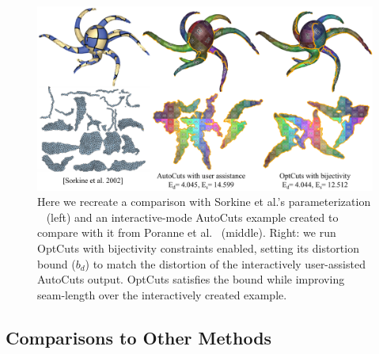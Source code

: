 \begin{figure}[t]
\centering
\includegraphics[width=\linewidth]{fig/comp_AutoCuts_Olga.png}
\caption{Here we recreate a comparison with Sorkine et al.'s parameterization \  (left) and an interactive-mode AutoCuts example created to compare with it from Poranne et al.\  (middle). 
Right: we run OptCuts with bijectivity constraints enabled, setting its distortion bound ($b_d$) to match the distortion of the interactively user-assisted AutoCuts output. OptCuts satisfies the bound while improving seam-length over the interactively created example.}
\label{fig:comp_AutoCuts_Olga}
\end{figure}

\subsection{Comparisons to Other Methods}
\label{sec:cmpr_other}

